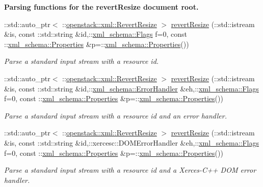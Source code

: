 \begin{Indent}{\bf Parsing functions for the revertResize document root.}
\begin{DoxyCompactItemize}
::std::auto\_\-ptr$<$ ::\hyperlink{classopenstack_1_1xml_1_1RevertResize}{openstack::xml::RevertResize} $>$ \hyperlink{namespaceopenstack_1_1xml_a35449b57fde486e27d28aaefcb82bab7}{revertResize} (::std::istream \&is, const ::std::string \&id,::\hyperlink{namespacexml__schema_affb4c227cbd9aa7453dd1dc5a1401943}{xml\_\-schema::Flags} f=0, const ::\hyperlink{namespacexml__schema_ad27ce19a7ee1d3b1064092648898f64c}{xml\_\-schema::Properties} \&p=::\hyperlink{namespacexml__schema_ad27ce19a7ee1d3b1064092648898f64c}{xml\_\-schema::Properties}())
\begin{DoxyCompactList}\small\item\em Parse a standard input stream with a resource id. \item\end{DoxyCompactList}\item 
::std::auto\_\-ptr$<$ ::\hyperlink{classopenstack_1_1xml_1_1RevertResize}{openstack::xml::RevertResize} $>$ \hyperlink{namespaceopenstack_1_1xml_a7027957803ec2f868dd158d06f4586cf}{revertResize} (::std::istream \&is, const ::std::string \&id,::\hyperlink{namespacexml__schema_ab1c9361bfd3b404eaabf0c31eded79dc}{xml\_\-schema::ErrorHandler} \&eh,::\hyperlink{namespacexml__schema_affb4c227cbd9aa7453dd1dc5a1401943}{xml\_\-schema::Flags} f=0, const ::\hyperlink{namespacexml__schema_ad27ce19a7ee1d3b1064092648898f64c}{xml\_\-schema::Properties} \&p=::\hyperlink{namespacexml__schema_ad27ce19a7ee1d3b1064092648898f64c}{xml\_\-schema::Properties}())
\begin{DoxyCompactList}\small\item\em Parse a standard input stream with a resource id and an error handler. \item\end{DoxyCompactList}\item 
::std::auto\_\-ptr$<$ ::\hyperlink{classopenstack_1_1xml_1_1RevertResize}{openstack::xml::RevertResize} $>$ \hyperlink{namespaceopenstack_1_1xml_a3efce39aa6da0af79819cd0e978b3fb0}{revertResize} (::std::istream \&is, const ::std::string \&id,::xercesc::DOMErrorHandler \&eh,::\hyperlink{namespacexml__schema_affb4c227cbd9aa7453dd1dc5a1401943}{xml\_\-schema::Flags} f=0, const ::\hyperlink{namespacexml__schema_ad27ce19a7ee1d3b1064092648898f64c}{xml\_\-schema::Properties} \&p=::\hyperlink{namespacexml__schema_ad27ce19a7ee1d3b1064092648898f64c}{xml\_\-schema::Properties}())
\begin{DoxyCompactList}\small\item\em Parse a standard input stream with a resource id and a Xerces-\/C++ DOM error handler. \item\end{DoxyCompactList}\item 

\end{DoxyCompactItemize}
\end{Indent}
